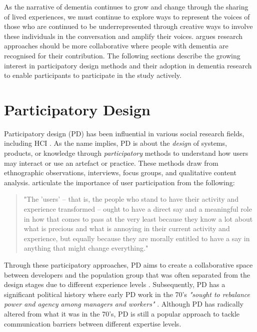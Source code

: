 As the narrative of dementia continues to grow and change through the sharing of lived experiences, we must continue to explore ways to represent the voices of those who are continued to be underrepresented through creative ways to involve these individuals in the conversation and amplify their voices. \cite{swarbrick2015quest} argues research approaches should be more collaborative where people with dementia are recognised for their contribution. The following sections describe the growing interest in participatory design methods and their adoption in dementia research to enable participants to participate in the study actively. 

\section{Participatory Design}
\label{Method:PD}
Participatory design (PD) has been influential in various social research fields, including HCI \citep{bannon2018introduction}. As the name implies, PD is about the \textit{design} of systems, products, or knowledge through \textit{participatory} methods to understand how users may interact or use an artefact or practice. These methods draw from ethnographic observations, interviews, focus groups, and qualitative content analysis. \cite{carroll2007participatory} articulate the importance of user participation from the following:

\begin{quote}
"The 'users' – that is, the people who stand to have their activity and experience transformed – ought to have a direct say and a meaningful role in how that comes to pass at the very least because they know a lot about what is precious and what is annoying in their current activity and experience, but equally because they are morally entitled to have a say in anything that might change everything." \citep{carroll2007participatory}    
\end{quote}

Through these participatory approaches, PD aims to create a collaborative space between developers and the population group that was often separated from the design stages due to different experience levels \citep{duarte2018participatory}. Subsequently, PD has a significant political history where early PD work in the 70's \textit{"sought to rebalance power and agency among managers and workers" } \citep{bannon2018introduction}. Although PD has radically altered from what it was in the 70's, PD is still a popular approach to tackle communication barriers between different expertise levels. 

